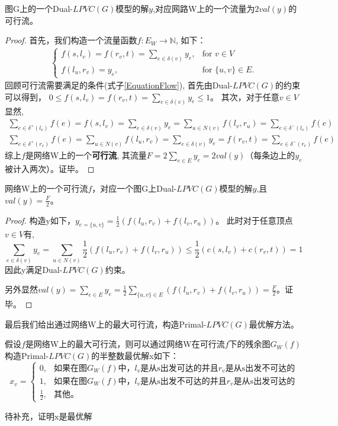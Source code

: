 \begin{property}
图G上的一个Dual-$LPVC(G)$模型的解$y$,对应网路W上的一个流量为$2val(y)$的可行流。
\end{property}
\begin{proof}
  首先，我们构造一个流量函数$f:E_W \rightarrow \mathbb{N}$, 如下：
  \begin{equation*}\begin{aligned} \begin{cases}
    f(s, l_v) = f(r_v, t) = \sum\limits_{e \in \delta(v)}{y_e}, & \mbox{for } v \in V \\
    f(l_u, r_v) = y_e, & \mbox{for } \{u, v\} \in E.
  \end{cases}\end{aligned}\end{equation*}
  回顾可行流需要满足的条件(式子\ref{EquationFlow}), 首先由Dual-$LPVC(G)$的约束可以得到，
  $0 \le f(s, l_v) = f(r_v, t) = \sum\limits_{e \in \delta(v)}{y_e} \le 1$。
  其次，对于任意$v \in V$ 显然,
  \[ \begin{aligned}
     \sum_{e\in \delta^+(l_v)}{f(e)} = f(s, l_v) = \sum\limits_{e \in \delta(v)}{y_e} = \sum_{u \in N(v)}{f(l_v, r_u)} = \sum_{e\in \delta^-(l_v)}{f(e)} \\
    \sum_{e\in \delta^+(r_v)}{f(e)} = \sum_{u \in N(v)}{f(l_u, r_v)}  = \sum\limits_{e \in \delta(v)}{y_e} = f(r_v, t) = \sum_{e\in \delta^-(r_v)}{f(e)}
  \end{aligned} \]
  综上$f$是网络W上的一个\textbf{可行流}, 其流量$F = 2\sum_{e \in E}{y_e} = 2val(y)$（每条边上的$y_e$被计入两次）。证毕。
\end{proof}

\begin{property}
网络W上的一个可行流$f$，对应一个图G上Dual-$LPVC(G)$模型的解$y$,且$val(y) = \frac{F}{2}$。
\end{property}
\begin{proof}
构造y如下，$y_{e = \{u, v\}} = \frac{1}{2}(f(l_u, r_v) + f(l_v, r_u))$。
此时对于任意顶点$v \in V$有, 
\[\sum\limits_{e \in \delta(v)}{y_e} = \sum\limits_{u \in N(v)}{\frac{1}{2}(f(l_u, r_v) + f(l_v, r_u))} \le \frac{1}{2}(c(s, l_v) + c(r_v, t)) = 1\]
因此y满足Dual-$LPVC(G)$约束。

另外显然$val(y) = \sum_{e \in E}{y_e} = \frac{1}{2}\sum\limits_{\{u, v\}\in E}{(f(l_u, r_v) + f(l_v, r_u))} = \frac{F}{2}$。证毕。
\end{proof}

最后我们给出通过网络W上的最大可行流，构造Primal-$LPVC(G)$最优解方法。

假设$f$是网络W上的最大可行流，则可以通过网络W在可行流$f$下的残余图$G_W(f)$构造Primal-$LPVC(G)$的半整数最优解x如下：
\begin{equation*}
  x_v = \begin{cases}
            0, & \mbox{如果在图$G_W(f)$中，$l_v$是从s出发可达的并且$r_v$是从s出发不可达的}  \\
            1, & \mbox{如果在图$G_W(f)$中，$l_v$是从s出发不可达的并且$r_v$是从s出发可达的}  \\
            \frac{1}{2}, & \mbox{其他。}
          \end{cases}
\end{equation*}

\textcolor[rgb]{1.00,0.00,0.00}{待补充，证明x是最优解}